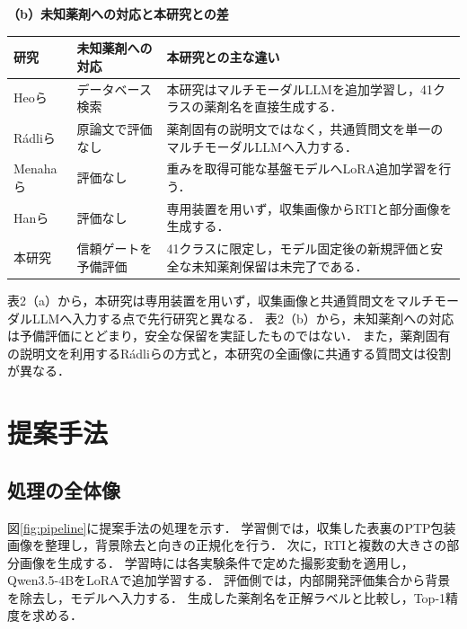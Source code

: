 \documentclass[uplatex,dvipdfmx]{jsarticle}
\begin{document}
\begin{table}[H]
  \vspace{3mm}
  \textbf{（b）未知薬剤への対応と本研究との差}\\[1mm]
  \begin{tabularx}{\textwidth}{|>{\raggedright\arraybackslash}p{1.55cm}|>{\raggedright\arraybackslash}p{3.2cm}|>{\raggedright\arraybackslash}X|}
    \hline
    研究 & 未知薬剤への対応 & 本研究との主な違い \\ \hline
    Heoら\cite{heo2023pill} & データベース検索 & 本研究はマルチモーダルLLMを追加学習し，41クラスの薬剤名を直接生成する． \\ \hline
    Rádliら\cite{radli2024word,radli2024metric} & 原論文で評価なし & 薬剤固有の説明文ではなく，共通質問文を単一のマルチモーダルLLMへ入力する． \\ \hline
    Menahaら\cite{menaha2024gemini} & 評価なし & 重みを取得可能な基盤モデルへLoRA追加学習を行う． \\ \hline
    Hanら\cite{han2021blister} & 評価なし & 専用装置を用いず，収集画像からRTIと部分画像を生成する． \\ \hline
    本研究 & 信頼ゲートを予備評価 & 41クラスに限定し，モデル固定後の新規評価と安全な未知薬剤保留は未完了である． \\ \hline
  \end{tabularx}
\end{table}

表2（a）から，本研究は専用装置を用いず，収集画像と共通質問文をマルチモーダルLLMへ入力する点で先行研究と異なる．
表2（b）から，未知薬剤への対応は予備評価にとどまり，安全な保留を実証したものではない．
また，薬剤固有の説明文を利用するRádliらの方式と，本研究の全画像に共通する質問文は役割が異なる．

\clearpage

\section{提案手法}\label{sec:method}

\subsection{処理の全体像}

図\ref{fig:pipeline}に提案手法の処理を示す．
学習側では，収集した表裏のPTP包装画像を整理し，背景除去と向きの正規化を行う．
次に，RTIと複数の大きさの部分画像を生成する．
学習時には各実験条件で定めた撮影変動を適用し，Qwen3.5-4BをLoRAで追加学習する．
評価側では，内部開発評価集合から背景を除去し，モデルへ入力する．
生成した薬剤名を正解ラベルと比較し，Top-1精度を求める．
\end{document}
